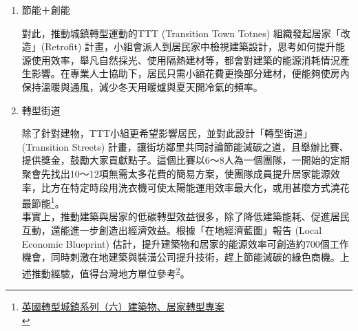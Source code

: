 \documentclass[a4paper,12pt]{article}
\begin{document}
\begin{enumerate}
\begin{enumerate}
為提升城鎮經濟的韌性，TTT (Transition Town Totnes) 組織開始推動境內使用的在地貨幣，確保經濟能量在內部不斷循環。TT發行的「托特尼斯鎊」(Totnes Pound) 分為：1鎊、5鎊、10鎊、21鎊等四種面額，並朝向電子化，消費者可用手機開戶，透過網路兌現、並進行交易。許多人好奇為何是「21鎊」的面額；而非「20鎊」？轉型運動發起者Rob Hopkins幽默地說，「這種設計就是希望托特尼斯的貨幣與眾不同！」\\

由於在地貨幣無法在其他城鎮使用，因此TTT組織會努力行銷，鼓勵觀光客下次再回來消費，才能把沒用完的托特尼斯鎊花光，替地方增加回頭客。從環境角度審視的效益也不錯，因加入在地貨幣的商家多屬餐飲服務類，採購食材和物料會用在地貨幣向附近的供應商採買，藉此大為縮短了食物運輸里程\footnote{\href{https://lowestc.blogspot.com/2017/02/blog-post\_69.html}{英國轉型城鎮系列（四）城鎮韌性專案之「在地貨幣」}\\}。\\
\item 節能＋創能
\label{sec:org802d567}

對此，推動城鎮轉型運動的TTT (Transition Town Totnes) 組織發起居家「改造」(Retrofit) 計畫，小組會派人到居民家中檢視建築設計，思考如何提升能源使用效率，舉凡自然採光、使用隔熱建材等，都會對建築的能源消耗情況產生影響。在專業人士協助下，居民只需小額花費更換部分建材，便能夠使房內保持溫暖與通風，減少冬天用暖爐與夏天開冷氣的頻率。\\
\item 轉型街道
\label{sec:org8089d03}

除了針對建物，TTT小組更希望影響居民，並對此設計「轉型街道」 (Transition Streets) 計畫，讓街坊鄰里共同討論節能減碳之道，且舉辦比賽、提供獎金，鼓勵大家貢獻點子。這個比賽以6～8人為一個團隊，一開始的定期聚會先找出10～12項無需太多花費的簡易方案，使團隊成員提升居家能源效率，比方在特定時段用洗衣機可使太陽能運用效率最大化，或用甚麼方式澆花最節能\footnote{\href{https://lowestc.blogspot.com/2017/07/blog-post\_17.html}{英國轉型城鎮系列（六）建築物、居家轉型專案 }\\\label{orgad790b0}}。\\

事實上，推動建築與居家的低碳轉型效益很多，除了降低建築能耗、促進居民互動，還能進一步創造出經濟效益。根據「在地經濟藍圖」報告 (Local Economic Blueprint) 估計，提升建築物和居家的能源效率可創造約700個工作機會，同時刺激在地建築與裝潢公司提升技術，趕上節能減碳的綠色商機。上述推動經驗，值得台灣地方單位參考\textsuperscript{\ref{orgad790b0}}。\\
\end{enumerate}


\end{enumerate}
\end{document}
